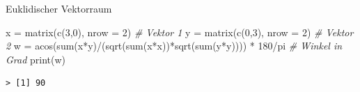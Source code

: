 \documentclass[
  8pt,
  ignorenonframetext,
]{beamer}
\newenvironment{Shaded}{\begin{snugshade}}{\end{snugshade}}
\newcommand{\AttributeTok}[1]{\textcolor[rgb]{0.77,0.63,0.00}{#1}}
\newcommand{\CommentTok}[1]{\textcolor[rgb]{0.56,0.35,0.01}{\textit{#1}}}
\newcommand{\DecValTok}[1]{\textcolor[rgb]{0.00,0.00,0.81}{#1}}
\newcommand{\FunctionTok}[1]{\textcolor[rgb]{0.00,0.00,0.00}{#1}}
\newcommand{\NormalTok}[1]{#1}
\newcommand{\OtherTok}[1]{\textcolor[rgb]{0.56,0.35,0.01}{#1}}
\newcommand{\SpecialCharTok}[1]{\textcolor[rgb]{0.00,0.00,0.00}{#1}}
\begin{document}
\begin{frame}[fragile]{Euklidischer Vektorraum}
\begin{Shaded}
\begin{Highlighting}[]
\NormalTok{x }\OtherTok{=} \FunctionTok{matrix}\NormalTok{(}\FunctionTok{c}\NormalTok{(}\DecValTok{3}\NormalTok{,}\DecValTok{0}\NormalTok{), }\AttributeTok{nrow =} \DecValTok{2}\NormalTok{)                                   }\CommentTok{\# Vektor 1}
\NormalTok{y }\OtherTok{=} \FunctionTok{matrix}\NormalTok{(}\FunctionTok{c}\NormalTok{(}\DecValTok{0}\NormalTok{,}\DecValTok{3}\NormalTok{), }\AttributeTok{nrow =} \DecValTok{2}\NormalTok{)                                   }\CommentTok{\# Vektor 2}
\NormalTok{w }\OtherTok{=} \FunctionTok{acos}\NormalTok{(}\FunctionTok{sum}\NormalTok{(x}\SpecialCharTok{*}\NormalTok{y)}\SpecialCharTok{/}\NormalTok{(}\FunctionTok{sqrt}\NormalTok{(}\FunctionTok{sum}\NormalTok{(x}\SpecialCharTok{*}\NormalTok{x))}\SpecialCharTok{*}\FunctionTok{sqrt}\NormalTok{(}\FunctionTok{sum}\NormalTok{(y}\SpecialCharTok{*}\NormalTok{y)))) }\SpecialCharTok{*} \DecValTok{180}\SpecialCharTok{/}\NormalTok{pi    }\CommentTok{\# Winkel in Grad}
\FunctionTok{print}\NormalTok{(w)}
\end{Highlighting}
\end{Shaded}

\begin{verbatim}
> [1] 90
\end{verbatim}
\end{frame}
\end{document}
